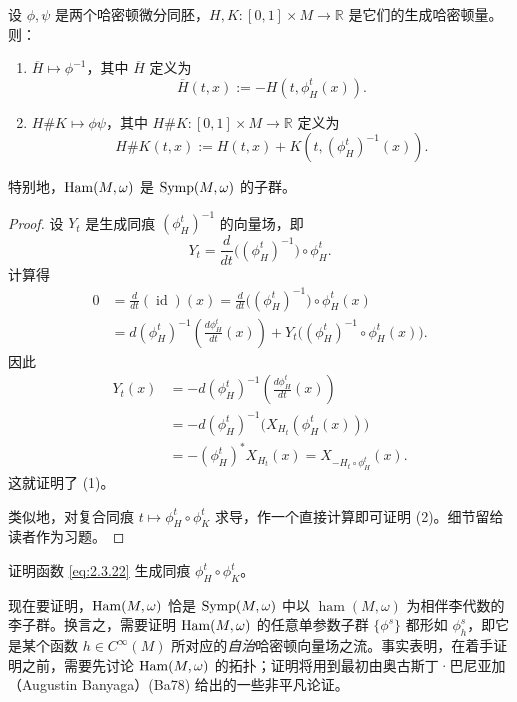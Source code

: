\begin{proposition}
\label{prop:hamiltonian-composition-inverse}
设 $\phi,\psi$ 是两个哈密顿微分同胚，$H,K:[0,1]\times M\to\mathbb R$ 是它们的生成哈密顿量。则：
\begin{enumerate}[label=(\arabic*)]
  \item $\overline H\mapsto\phi^{-1}$，其中 $\overline H$ 定义为
  \begin{equation}
    \overline H(t,x):=-H(t,\phi_H^t(x)).
    \label{eq:2.3.21}
  \end{equation}
  \item $H\#K\mapsto\phi\psi$，其中 $H\#K:[0,1]\times M\to\mathbb R$ 定义为
  \begin{equation}
    H\#K(t,x):=H(t,x)+K(t,(\phi_H^t)^{-1}(x)).
    \label{eq:2.3.22}
  \end{equation}
\end{enumerate}
特别地，$\operatorname{Ham}(M,\omega)$ 是 $\operatorname{Symp}(M,\omega)$ 的子群。
\end{proposition}

\begin{proof}
设 $Y_t$ 是生成同痕 $(\phi_H^t)^{-1}$ 的向量场，即
\[
  Y_t=\frac d{dt}\bigl((\phi_H^t)^{-1}\bigr)\circ\phi_H^t.
\]
计算得
\begin{align*}
 0&=\frac d{dt}(\operatorname{id})(x)
   =\frac d{dt}\bigl((\phi_H^t)^{-1}\bigr)\circ\phi_H^t(x)\\
  &=d(\phi_H^t)^{-1}\left(\frac{d\phi_H^t}{dt}(x)\right)
    +Y_t\bigl((\phi_H^t)^{-1}\circ\phi_H^t(x)\bigr).
\end{align*}
因此
\begin{align*}
 Y_t(x)
 &=-d(\phi_H^t)^{-1}\left(\frac{d\phi_H^t}{dt}(x)\right)\\
 &=-d(\phi_H^t)^{-1}\bigl(X_{H_t}(\phi_H^t(x))\bigr)\\
 &=-(\phi_H^t)^*X_{H_t}(x)
   =X_{-H_t\circ\phi_H^t}(x).
\end{align*}
这就证明了 (1)。

类似地，对复合同痕 $t\mapsto\phi_H^t\circ\phi_K^t$ 求导，作一个直接计算即可证明 (2)。细节留给读者作为习题。
\end{proof}

\begin{exercise}
\label{ex:composition-hamiltonian}
证明函数 \eqref{eq:2.3.22} 生成同痕 $\phi_H^t\circ\phi_K^t$。
\end{exercise}

现在要证明，$\operatorname{Ham}(M,\omega)$ 恰是 $\operatorname{Symp}(M,\omega)$ 中以 $\operatorname{ham}(M,\omega)$ 为相伴李代数的李子群。换言之，需要证明 $\operatorname{Ham}(M,\omega)$ 的任意单参数子群 $\{\phi^s\}$ 都形如 $\phi_h^s$，即它是某个函数 $h\in C^\infty(M)$ 所对应的\emph{自治}哈密顿向量场之流。事实表明，在着手证明之前，需要先讨论 $\operatorname{Ham}(M,\omega)$ 的拓扑；证明将用到最初由奥古斯丁·巴尼亚加（Augustin Banyaga）(Ba78) 给出的一些非平凡论证。

